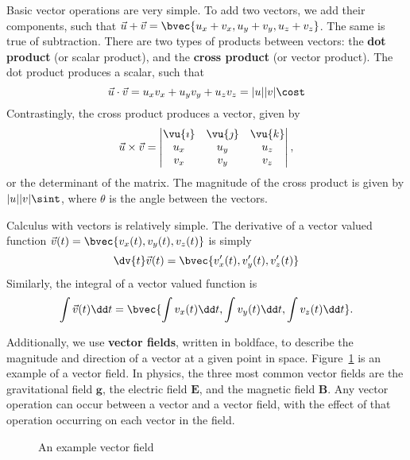\documentclass[11pt]{article}
\begin{document}
Basic vector operations are very simple. To add two vectors, we add their components, such that $\vec{u} + \vec{v} = \bvec{u_x + v_x, u_y + v_y, u_z + v_z}$. The same is true of subtraction. There are two types of products between vectors: the \textbf{dot product} (or scalar product), and the \textbf{cross product} (or vector product). The dot product produces a scalar, such that
\begin{equation}
    \vec{u} \cdot \vec{v} = u_xv_x + u_yv_y + u_zv_z = |u||v|\cost
\end{equation}
Contrastingly, the cross product produces a vector, given by
\begin{equation}
    \vec{u} \times \vec{v} = \begin{vmatrix}
        \vu{\imath} & \vu{\jmath} & \vu{k} \\
        u_x & u_y & u_z \\
        v_x & v_y & v_z
    \end{vmatrix},
\end{equation}
or the determinant of the matrix. The magnitude of the cross product is given by $|u||v|\sint$, where $\theta$ is the angle between the vectors.

Calculus with vectors is relatively simple. The derivative of a vector valued function $\vec{v}(t) = \bvec{v_x(t), v_y(t), v_z(t)}$ is simply
\begin{equation}
    \dv{t}\vec{v}(t) = \bvec{v'_x(t), v'_y(t), v'_z(t)}
\end{equation}
Similarly, the integral of a vector valued function is
\begin{equation}
    \int \vec{v}(t) \dd t = \bvec{\int v_x(t)\dd t, \int v_y(t)\dd t, \int v_z(t)\dd t}.
\end{equation}

Additionally, we use \textbf{vector fields}, written in boldface, to describe the magnitude and direction of a vector at a given point in space. Figure~\ref{vectorfieldexample} is an example of a vector field. In physics, the three most common vector fields are the gravitational field $\mathbf{g}$, the electric field $\mathbf{E}$, and the magnetic field $\mathbf{B}$. Any vector operation can occur between a vector and a vector field, with the effect of that operation occurring on each vector in the field.

\begin{figure}[t!]\label{vectorfieldexample}
    \centering
\caption{An example vector field}
\end{figure}
\end{document}
